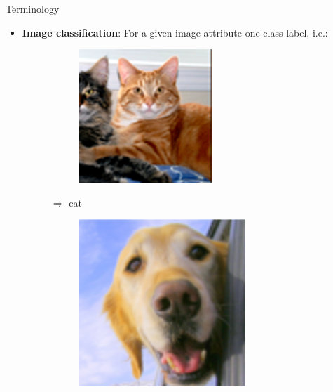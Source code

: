 \documentclass[xcolor={usenames,dvipsnames}]{beamer}
\begin{document}
\begin{frame}{Terminology}
	\begin{itemize}
		\item {\color{greenWUR}\textbf{Image classification}}: For a given image attribute one class label, i.e.:
		\begin{figure}[H]
			\begin{subfigure}{.1\textwidth}
				\includegraphics[width=\textwidth]{cat} 
			\end{subfigure} $\Rightarrow$ cat
			\begin{subfigure}{.1\textwidth}
				\includegraphics[width=\textwidth]{dog}

\end{subfigure}
\end{figure}
\end{itemize}
\end{frame}
\end{document}
